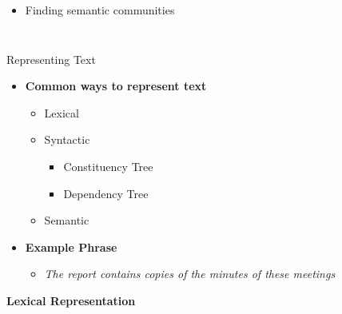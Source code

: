 \documentclass[10pt,=table]{beamer}
\begin{document}
\begin{frame}
\begin{columns}
\begin{minipage}[c][0.5\textheight][c]{\linewidth}
	\begin{itemize}
		\item[] Finding \textcolor{orangeEric}{semantic communities}
	\end{itemize}	
	\end{minipage}	
\end{columns}

\vspace{\textheight}

\end{frame}

\begin{frame}{Representing Text}

\begin{itemize}
	\item \textbf{Common ways to represent text}
	\begin{itemize}
		\item Lexical
		\item Syntactic
		\begin{itemize}
				\item Constituency Tree
				\item Dependency Tree
		\end{itemize}
		\item Semantic
	\end{itemize}
	 \item \textbf{Example Phrase}
	\begin{itemize}
		\item[] \textit{The report contains copies of the minutes of these meetings}
	\end{itemize}
\end{itemize}

\begin{overprint}
  				
	  \vfill
	  \centering
	  \textbf{Lexical Representation}
	  \vspace{.3cm}
	  	  

\end{overprint}
\end{frame}
\end{document}
